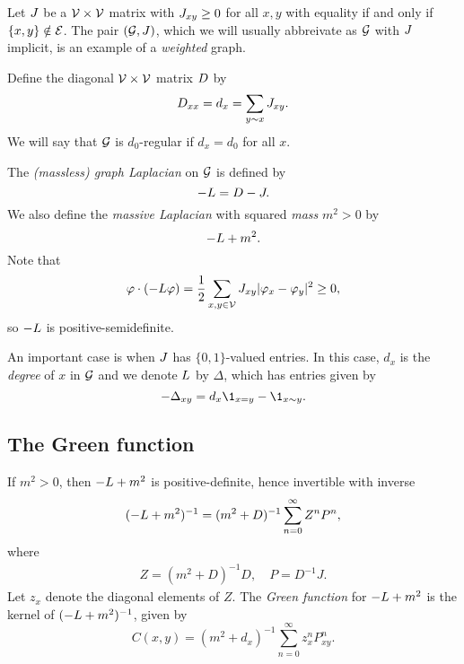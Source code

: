 Let $J$ be a $\mathcal{V}\times\mathcal{V}$ matrix with $J_{xy} \ge 0$ for all $x, y$ with equality if and only if $\{ x, y \} \notin \mathcal{E}$. The pair
$(\mathcal{G}, J)$, which we will usually abbreivate as $\mathcal{G}$ with $J$ implicit, is an example of a \emph{weighted} graph.

Define the diagonal $\mathcal{V}\times\mathcal{V}$ matrix $D$ by
\begin{equation}
D_{xx} = d_x = \sum_{y \sim x} J_{xy}.
\end{equation}
We will say that $\mathcal{G}$ is $d_0$-regular if $d_x = d_0$ for all $x$.

The \emph{(massless) graph Laplacian} on $\mathcal{G}$ is defined by
\begin{equation}
-L = D - J.
\end{equation}
We also define the \emph{massive Laplacian} with squared \emph{mass} $m^2 > 0$
by
\begin{equation}
-L + m^2.
\end{equation}
Note that
\begin{equation}
\varphi \cdot (-L \varphi)
  =
\frac{1}{2} \sum_{x,y\in\mathcal{V}} J_{xy} |\varphi_x - \varphi_y|^2
  \ge
0,
\end{equation}
so $-L$ is positive-semidefinite.

\begin{example}
An important case is when $J$ has $\{0, 1 \}$-valued entries. In this case, $d_x$ is the \emph{degree} of $x$ in $\mathcal{G}$ and we denote $L$ by
$\Delta$, which has entries given by
\begin{equation}
-\Delta_{xy} = d_x \1_{x=y} - \1_{x \sim y}.
\end{equation}
\end{example}


\subsection{The Green function}

If $m^2 > 0$, then $-L + m^2$ is positive-definite, hence invertible with inverse
\begin{equation}
(-L + m^2)^{-1} = (m^2 + D)^{-1} \sum_{n=0}^\infty Z^n P^n,
\end{equation}
where
\begin{align}
Z = (m^2 + D)^{-1} D,
  \quad
P = D^{-1} J.
\end{align}
Let $z_x$ denote the diagonal elements of $Z$. The \emph{Green function} for
$-L + m^2$ is the kernel of $(-L + m^2)^{-1}$, given by
\begin{equation}
C(x, y)
  =
(m^2 + d_x)^{-1} \sum_{n=0}^\infty z_x^n P^n_{xy}.
\end{equation}

